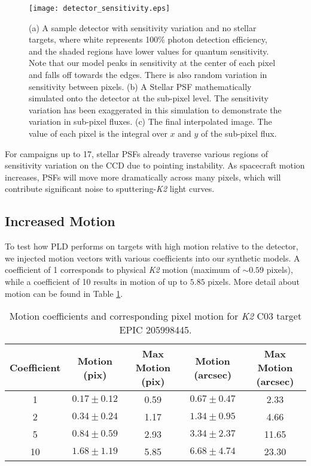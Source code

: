 \documentclass[12pt,preprint]{aastex}
\begin{document}
\begin{figure}[h]
	\centering
	\texttt{[image: detector\_sensitivity.eps]}
	\caption{(a) A sample detector with sensitivity variation and no stellar targets, where white represents 100\% photon detection efficiency, and the shaded regions have lower values for quantum sensitivity. Note that our model peaks in sensitivity at the center of each pixel and falls off towards the edges. There is also random variation in sensitivity between pixels. (b) A Stellar PSF mathematically simulated onto the detector at the sub-pixel level. The sensitivity variation has been exaggerated in this simulation to demonstrate the variation in sub-pixel fluxes. (c) The final interpolated image. The value of each pixel is the integral over $x$ and $y$ of the sub-pixel flux.}
	\label{fig:detector_sensitivity}
\end{figure}

For campaigns up to 17, stellar PSFs already traverse various regions of sensitivity variation on the CCD due to pointing instability. As spacecraft motion increases, PSFs will move more dramatically across many pixels, which will contribute significant noise to sputtering-\textit{K2} light curves.

\subsection{Increased Motion}

To test how PLD performs on targets with high motion relative to the detector, we injected motion vectors with various coefficients into our synthetic models. A coefficient of 1 corresponds to physical \textit{K2} motion (maximum of $\sim 0.59$ pixels), while a coefficient of 10 results in motion of up to $5.85$ pixels. More detail about motion can be found in Table \ref{table:motionstatistics}.

\begin{table}[h!]
\begin{center}
    \begin{tabular}{c | c | c | c | c}
        Coefficient & Motion (pix) & Max Motion (pix) & Motion (arcsec) & Max Motion (arcsec) \\
        \hline \hline
        1 & $0.17\pm0.12$ & 0.59 & $0.67\pm0.47$ & 2.33 \\
        2 & $0.34\pm0.24$ & 1.17 & $1.34\pm0.95$ & 4.66 \\
				5 & $0.84\pm0.59$ & 2.93 & $3.34\pm2.37$ & 11.65 \\
				10 & $1.68\pm1.19$ & 5.85 & $6.68\pm4.74$ & 23.30 \\
   \end{tabular}
	 \caption{Motion coefficients and corresponding pixel motion for \textit{K2} C03 target EPIC 205998445.}
	 \label{table:motionstatistics}
\end{center}
\end{table}
\end{document}
